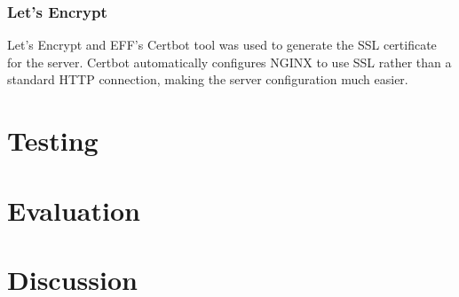 \documentclass[12pt,a4paper]{article}
\begin{document}
    \subsubsection*{Let's Encrypt}
    Let's Encrypt and EFF's Certbot tool was used to generate the SSL certificate for the server. Certbot automatically configures NGINX to use SSL rather than a standard HTTP connection, making the server configuration much easier.
    
    \section*{Testing}
    \section*{Evaluation}
    \section*{Discussion}
\end{document}
